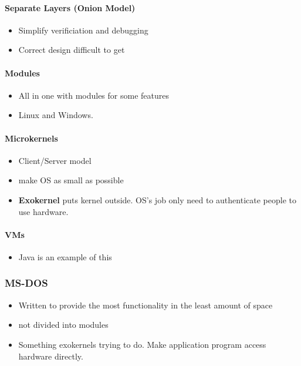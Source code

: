 \documentclass{article}
\newcommand\tab[1][0.5cm]{\hspace*{#1}}
\begin{document}
			\paragraph{\tab Separate Layers (Onion Model)}
			\begin{itemize}
				\item Simplify verificiation and debugging
				\item Correct design difficult to get
			\end{itemize}

			\paragraph{\tab Modules}
			\begin{itemize}
				\item All in one with modules for some features
				\item Linux and Windows.
			\end{itemize}

			\paragraph{\tab Microkernels}
			\begin{itemize}
				\item Client/Server model
				\item make OS as small as possible

				\item \textbf{Exokernel} puts kernel outside. OS's job only need to authenticate people to use hardware.
			\end{itemize}

			\paragraph{\tab VMs}
			\begin{itemize}
				\item Java is an example of this
			\end{itemize}

	\subsubsection{MS-DOS}
		\begin{itemize}
			\item Written to provide the most functionality in the least amount of space
			\item not divided into modules
			\item Something exokernels trying to do. Make application program access hardware directly.
		\end{itemize}
\end{document}
